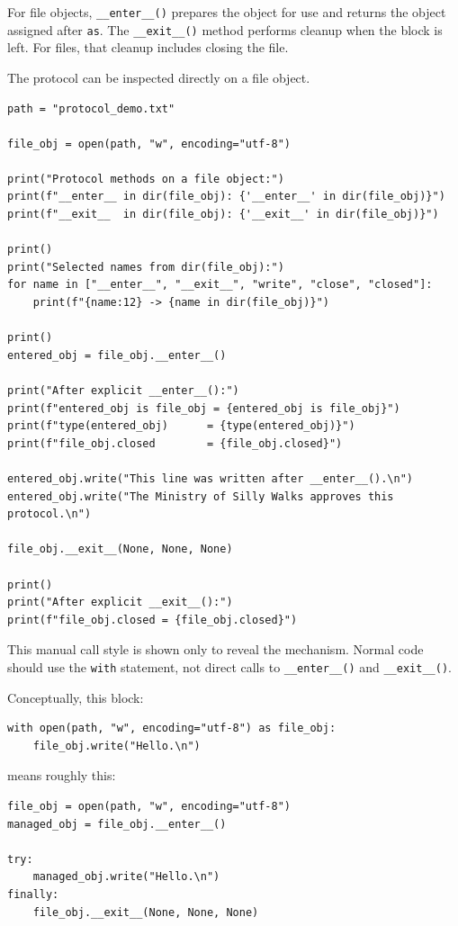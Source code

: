 For file objects, \texttt{\_\_enter\_\_()} prepares the object for use and returns the object assigned after \texttt{as}. The \texttt{\_\_exit\_\_()} method performs cleanup when the block is left. For files, that cleanup includes closing the file.

The protocol can be inspected directly on a file object.

\begin{verbatim}
path = "protocol_demo.txt"

file_obj = open(path, "w", encoding="utf-8")

print("Protocol methods on a file object:")
print(f"__enter__ in dir(file_obj): {'__enter__' in dir(file_obj)}")
print(f"__exit__  in dir(file_obj): {'__exit__' in dir(file_obj)}")

print()
print("Selected names from dir(file_obj):")
for name in ["__enter__", "__exit__", "write", "close", "closed"]:
    print(f"{name:12} -> {name in dir(file_obj)}")

print()
entered_obj = file_obj.__enter__()

print("After explicit __enter__():")
print(f"entered_obj is file_obj = {entered_obj is file_obj}")
print(f"type(entered_obj)      = {type(entered_obj)}")
print(f"file_obj.closed        = {file_obj.closed}")

entered_obj.write("This line was written after __enter__().\n")
entered_obj.write("The Ministry of Silly Walks approves this protocol.\n")

file_obj.__exit__(None, None, None)

print()
print("After explicit __exit__():")
print(f"file_obj.closed = {file_obj.closed}")
\end{verbatim}

This manual call style is shown only to reveal the mechanism. Normal code should use the \texttt{with} statement, not direct calls to \texttt{\_\_enter\_\_()} and \texttt{\_\_exit\_\_()}.

Conceptually, this block:

\begin{verbatim}
with open(path, "w", encoding="utf-8") as file_obj:
    file_obj.write("Hello.\n")
\end{verbatim}

means roughly this:

\begin{verbatim}
file_obj = open(path, "w", encoding="utf-8")
managed_obj = file_obj.__enter__()

try:
    managed_obj.write("Hello.\n")
finally:
    file_obj.__exit__(None, None, None)
\end{verbatim}

